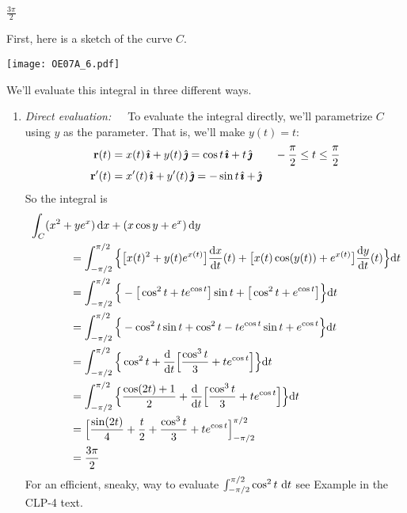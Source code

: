 \begin{answer} 
$\frac{3\pi}{2}$
\end{answer}

\begin{solution} 
First, here is a sketch of the curve $C$.

     \begin{center}
          \texttt{[image: OE07A\_6.pdf]}
     \end{center}


We'll evaluate this integral in three different ways.
\begin{enumerate}[(1)]
\item \emph{Direct evaluation:}\ \ \ To evaluate the integral directly,
we'll parametrize $C$ using $y$ as the parameter. That is, we'll make $y(t)=t$:
\begin{align*}
\mathbf{r}(t) &= x(t)\,\hat{\pmb{\imath}}+y(t)\,\hat{\pmb{\jmath}}
        = \cos t\,\hat{\pmb{\imath}} + t\,\hat{\pmb{\jmath}}\qquad -\frac{\pi}{2}\le t\le\frac{\pi}{2} \\
\mathbf{r}'(t) &= x'(t)\,\hat{\pmb{\imath}}+y'(t)\,\hat{\pmb{\jmath}}
        = -\sin t\,\hat{\pmb{\imath}} + \hat{\pmb{\jmath}} 
\end{align*}
So the integral is
\begin{align*}
&\int_C (x^2 + y e^x ) \,\dee{x} + (x \cos y + e^x ) \,\dee{y} \\
&\hskip0.5in
  =\int_{-\pi/2}^{\pi/2}\Big\{ \big[x(t)^2 +y(t) e^{x(t)}\big]\diff{x}{t}(t)
                        +  \big[x(t) \cos(y(t)) + e^{x(t)}\big]\diff{y}{t}(t)
                        \Big\}\dee{t} \\
&\hskip0.5in
  =\int_{-\pi/2}^{\pi/2}\Big\{ -\big[\cos^2 t + t e^{\cos t}\big]\sin t
                           +  \big[\cos^2 t + e^{\cos t}\big]
                        \Big\}\dee{t} \\
&\hskip0.5in
  =\int_{-\pi/2}^{\pi/2}\Big\{ -\cos^2 t\sin t +\cos^2 t 
                      - t e^{\cos t}\sin t + e^{\cos t}
                        \Big\}\dee{t} \\
&\hskip0.5in
  =\int_{-\pi/2}^{\pi/2}\Big\{ \cos^2 t 
                  +\diff{\hfill}{t}\Big[\frac{\cos^3 t}{3} +te^{\cos t}\Big]
                        \Big\}\dee{t} \\
&\hskip0.5in
  =\int_{-\pi/2}^{\pi/2}\Big\{ \frac{\cos(2t)+1}{2}
                  +\diff{\hfill}{t}\Big[\frac{\cos^3 t}{3} +te^{\cos t}\Big]
                        \Big\}\dee{t} \\
&\hskip0.5in
  =\Big[ \frac{\sin(2t)}{4} +\frac{t}{2}+
                  \frac{\cos^3 t}{3} +te^{\cos t}
                        \Big]_{-\pi/2}^{\pi/2} \\
&\hskip0.5in
  =\frac{3\pi}{2}
\end{align*}
For an efficient, sneaky, way to evaluate 
$\int_{-\pi/2}^{\pi/2} \cos^2 t\ \mathrm{d}t$ see Example
 in the CLP-4 text.


\end{enumerate}
\end{solution}
